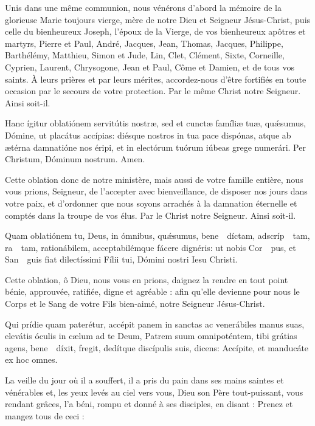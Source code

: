 \documentclass[twoside]{article}
\begin{document}
\begin{paracol}{2}
\switchcolumn

Unis dans une même communion, nous vénérons d’abord la mémoire de la glorieuse Marie toujours vierge, mère de notre Dieu et Seigneur Jésus-Christ, puis celle du bienheureux Joseph, l’époux de la Vierge,
de vos bienheureux apôtres et martyrs, Pierre et Paul, André, Jacques, Jean, Thomas, Jacques, Philippe, Barthélémy, Matthieu, Simon et Jude, Lin, Clet, Clément, Sixte, Corneille, Cyprien, Laurent, Chrysogone, Jean et Paul, Côme et Damien, et de tous vos saints.
À leurs prières et par leurs mérites, accordez-nous d’être fortiﬁés en toute occasion par le secours de votre protection. Par le même Christ notre Seigneur. Ainsi soit-il.

\switchcolumn*

Hanc ígitur oblatiónem servitútis nostræ, sed et cunctæ famíliæ tuæ,
quǽsumus, Dómine, ut placátus accípias: diésque nostros in tua pace dispónas, atque ab ætérna damnatióne nos éripi, et in electórum tuórum iúbeas grege numerári. Per Christum, Dóminum nostrum. Amen.

\switchcolumn

Cette oblation donc de notre ministère, mais aussi de votre famille entière,
nous vous prions, Seigneur, de l’accepter avec bienveillance, de disposer nos jours dans votre paix, et d’ordonner que nous soyons arrachés à la damnation éternelle et comptés dans la troupe de vos élus. Par le Christ notre Seigneur. Ainsi soit-il.

\switchcolumn*

Quam oblatiónem tu, Deus, in ómnibus, quǽsumus, bene~\cc~díctam, adscríp~\cc~tam, ra~\cc~tam, rationábilem, acceptabilémque fácere dignéris: ut nobis Cor~\cc~pus, et San~\cc~guis fiat dilectíssimi Fílii tui, Dómini nostri Iesu Christi.

\switchcolumn

Cette oblation, ô Dieu, nous vous en prions, daignez la rendre en tout point bénie, approuvée, ratiﬁée, digne et agréable : aﬁn qu’elle devienne pour nous le Corps et le Sang de votre Fils bien-aimé, notre Seigneur Jésus-Christ.

\switchcolumn*

Qui prídie quam paterétur, accépit panem in sanctas ac venerábiles manus suas, elevátis óculis in cælum ad te Deum, Patrem suum omnipoténtem, tibi grátias agens, bene~\cc~díxit, fregit, dedítque discípulis suis, dicens: Accípite, et manducáte ex hoc omnes.

\switchcolumn

La veille du jour où il a souffert, il a pris du pain dans ses mains saintes et vénérables et, les yeux levés au ciel vers vous, Dieu son Père tout-puissant, vous rendant grâces, l’a béni, rompu et donné à ses disciples, en disant :
Prenez et mangez tous de ceci :


\end{paracol}
\end{document}
